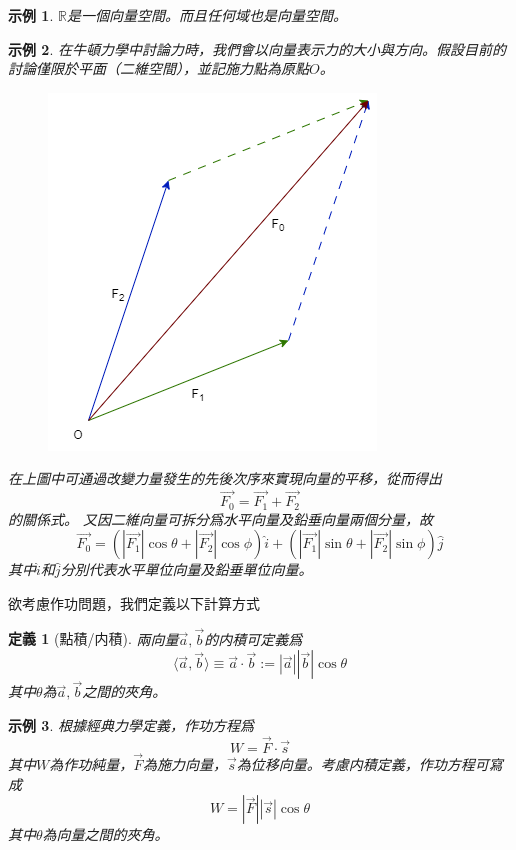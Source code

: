 \documentclass[12pt]{article}
\newcommand{\innerprod}[2]{\langle{#1},{#2}\rangle}
\newtheorem{definition}{定義}
\newtheorem*{example}{示例}
\begin{document}
    \begin{example}
        $\mathbb{R}$是一個向量空間。而且任何域也是向量空間。
    \end{example}

    \begin{example}
        在牛頓力學中討論力時，我們會以向量表示力的大小與方向。假設目前的討論僅限於平面（二維空間），並記施力點為原點$O$。
        \begin{figure}[H]
            \centering
            \includegraphics[scale=0.6]{Force.png}
        \end{figure}
        在上圖中可通過改變力量發生的先後次序來實現向量的平移，從而得出$$\vec{F_0}=\vec{F_1}+\vec{F_2}$$的關係式。
        又因二維向量可拆分爲水平向量及鉛垂向量兩個分量，故$$\vec{F_0}=(|\vec{F_1}|\cos{\theta}+|\vec{F_2}|\cos{\phi})\hat{i}+(|\vec{F_1}|\sin{\theta}+|\vec{F_2}|\sin{\phi})\hat{j}$$其中$\hat{i}$和$\hat{j}$分別代表水平單位向量及鉛垂單位向量。
    \end{example}

    欲考慮作功問題，我們定義以下計算方式

    \begin{definition}[點積/内積]
        兩向量$\vec{a},\vec{b}$的内積可定義爲$$\innerprod{\vec{a}}{\vec{b}}\equiv \vec{a}\cdot\vec{b}:=|\vec{a}||\vec{b}|\cos{\theta}$$其中$\theta$為$\vec{a},\vec{b}$之間的夾角。
    \end{definition}

    \begin{example}
        根據經典力學定義，作功方程爲$$W=\vec{F}\cdot\vec{s}$$其中$W$為作功純量，$\vec{F}$為施力向量，$\vec{s}$為位移向量。考慮内積定義，作功方程可寫成$$W=|\vec{F}||\vec{s}|\cos{\theta}$$其中$\theta$為向量之間的夾角。
    \end{example}
\end{document}
